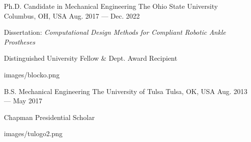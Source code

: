 

\begin{cventries}
	
	\cveducation
	{Ph.D. Candidate in Mechanical Engineering} %
	{The Ohio State University} %
	{Columbus, OH, USA} %
	{Aug. 2017 --- Dec. 2022} %
	{
		\begin{cvitems} %
			\item {Dissertation: \textit{Computational Design Methods for Compliant Robotic Ankle Prostheses}}
			\item {Distinguished University Fellow \& Dept. Award Recipient}
		\end{cvitems}
	}
	{images/blocko.png}

    \cveducation
    {B.S. Mechanical Engineering} %
    {The University of Tulsa} %
    {Tulsa, OK, USA} %
    {Aug. 2013 --- May 2017} %
    {
      \begin{cvitems} %
        \item {Chapman Presidential Scholar}
      \end{cvitems}
    }
    {images/tulogo2.png}
\end{cventries}
\vspace{3em}